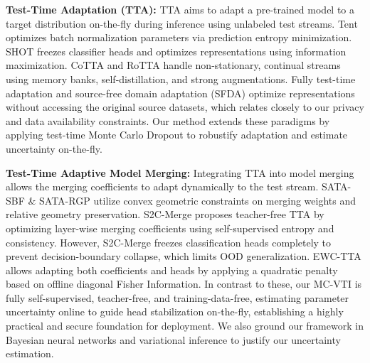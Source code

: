 \documentclass{article}
\theoremstyle{plain}
\theoremstyle{definition}
\theoremstyle{remark}
\begin{document}
\textbf{Test-Time Adaptation (TTA):} TTA aims to adapt a pre-trained model to a target distribution on-the-fly during inference using unlabeled test streams. Tent \cite{wang2021tent} optimizes batch normalization parameters via prediction entropy minimization. SHOT \cite{liang2020source} freezes classifier heads and optimizes representations using information maximization. CoTTA \cite{wang2022continual} and RoTTA \cite{dobler2022robustness} handle non-stationary, continual streams using memory banks, self-distillation, and strong augmentations. Fully test-time adaptation \cite{wang2021fully,niu2023towards} and source-free domain adaptation (SFDA) \cite{yang2021exploiting,yang2022attracting,yang2021generalized,liu2021domain} optimize representations without accessing the original source datasets, which relates closely to our privacy and data availability constraints. Our method extends these paradigms by applying test-time Monte Carlo Dropout \cite{gal2015bayesian,hermosilla2021monte} to robustify adaptation and estimate uncertainty on-the-fly.

\textbf{Test-Time Adaptive Model Merging:} Integrating TTA into model merging allows the merging coefficients to adapt dynamically to the test stream. SATA-SBF \& SATA-RGP \cite{sata2026convex} utilize convex geometric constraints on merging weights and relative geometry preservation. S2C-Merge \cite{s2c2026teacher} proposes teacher-free TTA by optimizing layer-wise merging coefficients using self-supervised entropy and consistency. However, S2C-Merge freezes classification heads completely to prevent decision-boundary collapse, which limits OOD generalization. EWC-TTA \cite{ewc2026elastic} allows adapting both coefficients and heads by applying a quadratic penalty based on offline diagonal Fisher Information. In contrast to these, our MC-VTI is fully self-supervised, teacher-free, and training-data-free, estimating parameter uncertainty online to guide head stabilization on-the-fly, establishing a highly practical and secure foundation for deployment. We also ground our framework in Bayesian neural networks \cite{zhou2025bayesian} and variational inference \cite{gelberg2024variational,hubin2023variational} to justify our uncertainty estimation.
\end{document}
